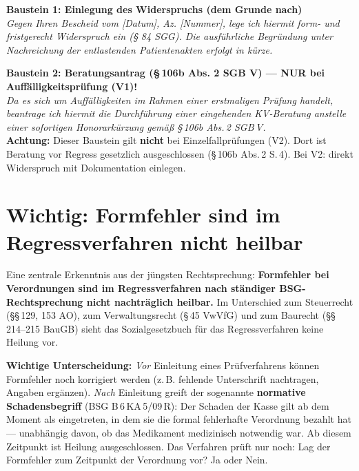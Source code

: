 \documentclass[a4paper]{umbruch-position}
\begin{document}
\begin{infobox}
\textbf{Baustein 1: Einlegung des Widerspruchs (dem Grunde nach)}\\
\textit{\glqq{}Gegen Ihren Bescheid vom [Datum], Az. [Nummer], lege ich hiermit form- und fristgerecht Widerspruch ein (§ 84 SGG). Die ausf\"uhrliche Begr\"undung unter Nachreichung der entlastenden Patientenakten erfolgt in k\"urze.\grqq{}}
\end{infobox}

\begin{infobox}
\textbf{Baustein 2: Beratungsantrag (\S\,106b Abs. 2 SGB V) --- NUR bei Auff\"alligkeitspr\"ufung (V1)!}\\
\textit{\glqq{}Da es sich um Auff\"alligkeiten im Rahmen einer erstmaligen Pr\"ufung handelt, beantrage ich hiermit die Durchf\"uhrung einer eingehenden KV-Beratung anstelle einer sofortigen Honorark\"urzung gem\"a\ss{} \S\,106b Abs.\,2 SGB\,V.\grqq{}}\\[4pt]
\textbf{Achtung:} Dieser Baustein gilt \textbf{nicht} bei Einzelfallpr\"ufungen (V2). Dort ist Beratung vor Regress gesetzlich ausgeschlossen (\S\,106b Abs.\,2 S.\,4). Bei V2: direkt Widerspruch mit Dokumentation einlegen.
\end{infobox}

\section{Wichtig: Formfehler sind im Regressverfahren nicht heilbar}

Eine zentrale Erkenntnis aus der j\"ungsten Rechtsprechung: \textbf{Formfehler bei Verordnungen sind im Regressverfahren nach st\"andiger BSG-Rechtsprechung nicht nachtr\"aglich heilbar.} Im Unterschied zum Steuerrecht (\S\S\,129, 153 AO), zum Verwaltungsrecht (\S\,45 VwVfG) und zum Baurecht (\S\S\,214--215 BauGB) sieht das Sozialgesetzbuch f\"ur das Regressverfahren keine Heilung vor.

\begin{infobox}
\textbf{Wichtige Unterscheidung:} \textit{Vor} Einleitung eines Pr\"ufverfahrens k\"onnen Formfehler noch korrigiert werden (z.\,B. fehlende Unterschrift nachtragen, Angaben erg\"anzen). \textit{Nach} Einleitung greift der sogenannte \textbf{normative Schadensbegriff} (BSG B\,6\,KA\,5/09\,R): Der Schaden der Kasse gilt ab dem Moment als eingetreten, in dem sie die formal fehlerhafte Verordnung bezahlt hat --- unabh\"angig davon, ob das Medikament medizinisch notwendig war. Ab diesem Zeitpunkt ist Heilung ausgeschlossen. Das Verfahren pr\"uft nur noch: Lag der Formfehler zum Zeitpunkt der Verordnung vor? Ja oder Nein.
\end{infobox}
\end{document}
